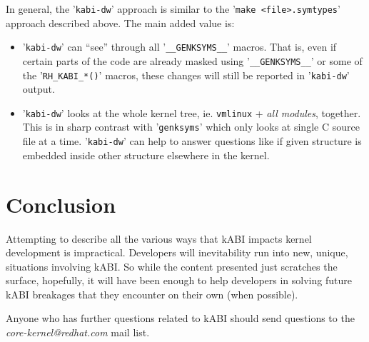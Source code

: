 \documentclass[10pt,oneside,english]{book}
\begin{document}
In general, the '\texttt{kabi-dw}' approach is similar to the '\texttt{make
<file>.symtypes}' approach described above. The main added value is:
\begin{itemize}
\item '\texttt{kabi-dw}' can ``see'' through all '\texttt{\_\_GENKSYMS\_\_}'
macros. That is, even if certain parts of the code are already masked
using '\texttt{\_\_GENKSYMS\_\_}' or some of the '\texttt{RH\_KABI\_{*}()}'
macros, these changes will still be reported in '\texttt{kabi-dw}'
output.
\item '\texttt{kabi-dw}' looks at the whole kernel tree, ie. \texttt{vmlinux}
+ \emph{all modules}, together. This is in sharp contrast with '\texttt{genksyms}'
which only looks at single C source file at a time. '\texttt{kabi-dw}'
can help to answer questions like if given structure is embedded inside
other structure elsewhere in the kernel.
\end{itemize}

\chapter{Conclusion}

Attempting to describe all the various ways that kABI impacts kernel
development is impractical. Developers will inevitability run into
new, unique, situations involving kABI. So while the content presented
just scratches the surface, hopefully, it will have been enough to
help developers in solving future kABI breakages that they encounter
on their own (when possible).

Anyone who has further questions related to kABI should send questions
to the \emph{core-kernel@redhat.com} mail list.
\end{document}
